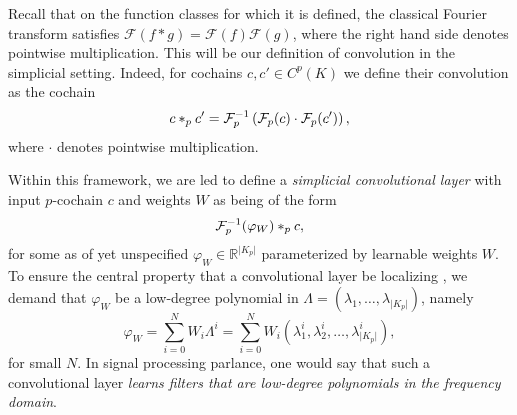 Recall that on the function classes for which it is defined, the classical Fourier transform satisfies $\mathcal{F}(f\ast g)=\mathcal{F}(f)\mathcal{F}(g)$, where the right hand side denotes pointwise multiplication. This will be our definition of convolution in the simplicial setting. Indeed, for cochains $c,c'\in C^p(K)$ we define their convolution as the cochain
\begin{equation*}
  c\ast_p c' = \mathcal{F}_p^{-1}\left(\mathcal{F}_p(c)\cdot\mathcal{F}_p(c')\right),
\end{equation*}
where $\cdot$ denotes pointwise multiplication.

Within this framework, we are led to define a \emph{simplicial convolutional layer} with input $p$-cochain $c$ and weights $W$ as being of the form
\begin{equation*}
  \mathcal{F}^{-1}_p(\varphi_W)\ast_p c ,
\end{equation*}
for some as of yet unspecified $\varphi_W\in\mathbb{R}^{\lvert K_p \rvert}$ parameterized by learnable weights $W$. To ensure the central property that a convolutional layer be localizing , we demand that $\varphi_W$ be a low-degree polynomial in $\Lambda=(\lambda_1, \dotsc, \lambda_{\lvert K_p \rvert})$, namely
\begin{equation*}
  \varphi_W = \sum_{i=0}^N W_i\Lambda^i = \sum_{i=0}^N W_i(\lambda^i_1, \lambda^i_2, \dotsc, \lambda^i_{\lvert K_p \rvert}),
\end{equation*}
for small $N$. In signal processing parlance, one would say that such a convolutional layer \emph{learns filters that are low-degree polynomials in the frequency domain}.

